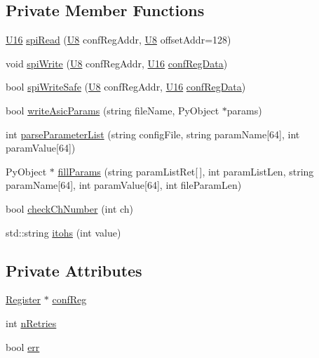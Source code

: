 \subsection*{Private Member Functions}
\begin{DoxyCompactItemize}
\item 
\hyperlink{ICECALv3_8h_adf928e51a60dba0df29d615401cc55a8}{U16} \hyperlink{classICECALv3_aced41ce20a0853d6248b8df88412e57a}{spi\+Read} (\hyperlink{ICECALv3_8h_a3cb25ca6f51f003950f9625ff05536fc}{U8} conf\+Reg\+Addr, \hyperlink{ICECALv3_8h_a3cb25ca6f51f003950f9625ff05536fc}{U8} offset\+Addr=128)
\item 
void \hyperlink{classICECALv3_aef00f02801dea4bda2093c930501dcdd}{spi\+Write} (\hyperlink{ICECALv3_8h_a3cb25ca6f51f003950f9625ff05536fc}{U8} conf\+Reg\+Addr, \hyperlink{ICECALv3_8h_adf928e51a60dba0df29d615401cc55a8}{U16} \hyperlink{structconfRegData}{conf\+Reg\+Data})
\item 
bool \hyperlink{classICECALv3_aa0b8358ea0be8e47a8aded5e1551787f}{spi\+Write\+Safe} (\hyperlink{ICECALv3_8h_a3cb25ca6f51f003950f9625ff05536fc}{U8} conf\+Reg\+Addr, \hyperlink{ICECALv3_8h_adf928e51a60dba0df29d615401cc55a8}{U16} \hyperlink{structconfRegData}{conf\+Reg\+Data})
\item 
bool \hyperlink{classICECALv3_a9d7c33e6d113e7f721dc848d28ab44d8}{write\+Asic\+Params} (string file\+Name, Py\+Object $\ast$params)
\item 
int \hyperlink{classICECALv3_a313e8166af1ce26b4026f883ad900fb9}{parse\+Parameter\+List} (string config\+File, string param\+Name\mbox{[}64\mbox{]}, int param\+Value\mbox{[}64\mbox{]})
\item 
Py\+Object $\ast$ \hyperlink{classICECALv3_ac006abc42a048308427f6801d783a407}{fill\+Params} (string param\+List\+Ret\mbox{[}$\,$\mbox{]}, int param\+List\+Len, string param\+Name\mbox{[}64\mbox{]}, int param\+Value\mbox{[}64\mbox{]}, int file\+Param\+Len)
\item 
bool \hyperlink{classICECALv3_a8753a74558f988b346a3fe350c5bbad4}{check\+Ch\+Number} (int ch)
\item 
std\+::string \hyperlink{classICECALv3_a04b02e583f191bfce34d05132cd23834}{itohs} (int value)
\end{DoxyCompactItemize}
\subsection*{Private Attributes}
\begin{DoxyCompactItemize}
\item 
\hyperlink{classRegister}{Register} $\ast$ \hyperlink{classICECALv3_a6e8b6c03f5b0f1d8281bf8a0fa46064f}{conf\+Reg}
\item 
int \hyperlink{classICECALv3_ae877ce34b3a4d6c368cc6409ac9614fa}{n\+Retries}
\item 
bool \hyperlink{classICECALv3_ad8989925ee5b3ff322d863ce6aaff0bd}{err}
\end{DoxyCompactItemize}
